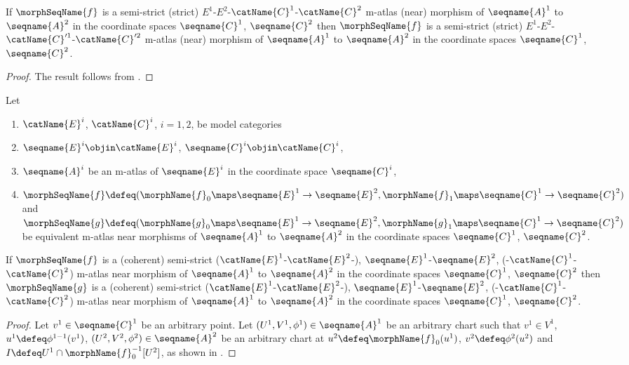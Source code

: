 \documentclass{article}
\begin{document}
\begin{corollary}
If $\morphSeqName{f}$ is a semi-strict (strict)
$E^1$-$E^2$-$\catName{C}^1$-$\catName{C}^2$ m-atlas (near) morphism of
$\seqname{A}^1$ to $\seqname{A}^2$ in the coordinate spaces
$\seqname{C}^1$, $\seqname{C}^2$ then $\morphSeqName{f}$ is a semi-strict
(strict) $E^1$-$E^2$-$\catName{C}'^1$-$\catName{C}'^2$ m-atlas (near)
morphism of $\seqname{A}^1$ to $\seqname{A}^2$ in the coordinate spaces
$\seqname{C}^1$, $\seqname{C}^2$.

\begin{proof}
The result follows from .
\end{proof}
\end{corollary}

\begin{lemma}
\label{lem:M-ATLmorphequiv}
Let
\begin{enumerate}
\item
$\catName{E}^i$, $\catName{C}^i$, $i=1,2$, be model categories
\item
$\seqname{E}^i \objin \catName{E}^i$,
$\seqname{C}^i \objin \catName{C}^i$,
\item
$\seqname{A}^i$ be an m-atlas of
$\seqname{E}^i$ in the coordinate space $\seqname{C}^i$,
\item
$
  \morphSeqName{f} \defeq
  (
    \morphName{f}_0 \maps \seqname{E}^1 \to \seqname{E}^2,
    \morphName{f}_1 \maps \seqname{C}^1 \to \seqname{C}^2
  )
$ and
$
  \morphSeqName{g} \defeq
  (
    \morphName{g}_0 \maps \seqname{E}^1 \to \seqname{E}^2,
    \morphName{g}_1 \maps \seqname{C}^1 \to \seqname{C}^2
  )
$
be equivalent m-atlas near morphisms of $\seqname{A}^1$ to
$\seqname{A}^2$ in the coordinate spaces $\seqname{C}^1$,
$\seqname{C}^2$.
\end{enumerate}

If $\morphSeqName{f}$ is a (coherent) semi-strict
\nobreaks
  {
    {($\catName{E}^1$-$\catName{E}^2$-)},
    {$\seqname{E}^1$-$\seqname{E}^2$},
    {(-$\catName{C}^1$-$\catName{C}^2$)}
  }
m-atlas near morphism of $\seqname{A}^1$ to $\seqname{A}^2$ in the
coordinate spaces $\seqname{C}^1$, $\seqname{C}^2$ then
$\morphSeqName{g}$ is a (coherent) semi-strict
\nobreaks
  {
    {($\catName{E}^1$-$\catName{E}^2$-)},
    {$\seqname{E}^1$-$\seqname{E}^2$},
    {(-$\catName{C}^1$-$\catName{C}^2$)}
  }
m-atlas near morphism of $\seqname{A}^1$ to $\seqname{A}^2$ in the
coordinate spaces $\seqname{C}^1$, $\seqname{C}^2$.

\begin{proof}
Let $v^1 \in \seqname{C}^1$ be an arbitrary point. Let
$(U^1,V^1,\phi^1) \in \seqname{A}^1$ be an arbitrary chart such that
$v^1 \in V^1$, $u^1 \defeq \phi^{1-1}(v^1)$,
$(U^2,V^2,\phi^2) \in \seqname{A}^2$ be an arbitrary chart at
$u^2 \defeq \morphName{f}_0(u^1)$, $v^2 \defeq \phi^2(u^2)$ and
$I \defeq U^1 \cap \morphName{f}_0^{-1}[U^2]$, as shown in
.


\end{proof}
\end{lemma}
\end{document}
